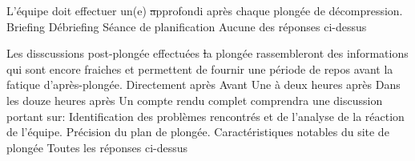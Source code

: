 \documentclass[english,10pt,twoside]{article}
\begin{document}
\begin{outline}
		\1 L'équipe doit effectuer un(e) \st approfondi après chaque plongée de décompression.
			\2 Briefing
			\2 Débriefing
			\2 Séance de planification
			\2 Aucune des réponses ci-dessus 

		\1 Les disscussions post-plongée effectuées \st la plongée rassembleront des informations qui sont encore fraiches et permettent de fournir une période de repos avant la fatique d'après-plongée.
			\2 Directement après
			\2 Avant
			\2 Une à deux heures après
			\2 Dans les douze heures après
		\1 Un compte rendu complet comprendra une discussion portant sur:
			\2 Identification des problèmes rencontrés et de l'analyse de la réaction de l'équipe.
			\2 Précision du plan de plongée.
			\2 Caractéristiques notables du site de plongée
			\2 Toutes les réponses ci-dessus

	\end{outline}
\end{document}
